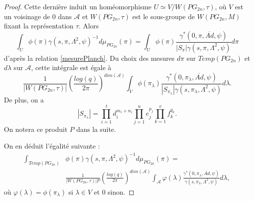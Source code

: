 \documentclass{amsart}
\begin{document}
\begin{proof}
Cette dernière induit un homéomorphisme $U \simeq V/W(PG_{2n}, \tau)$, où $V$ est un voisinage de 0 dans $\mathcal{A}$ et $W(PG_{2n}, \tau)$ est le sous-groupe de $W(PG_{2n}, M)$ fixant la représentation $\tau$. Alors
\begin{equation}
\int_U \phi(\pi) \gamma(s, \pi, \Lambda^2, \psi)^{-1} d\mu_{PG_{2n}}(\pi) = \int_U \phi(\pi) \frac{\gamma^*(0, \pi, \overline{Ad}, \psi)}{|S_{\pi}|\gamma(s, \pi, \Lambda^2, \psi)}  d\pi
\end{equation}
d'après la relation \ref{mesurePlanch}. Du choix des mesures $d\pi$ sur $Temp(PG_{2n})$ et $d\lambda$ sur $\mathcal{A}$, cette intégrale est égale à
\begin{equation}
\frac{1}{|W(PG_{2n}, \tau)|} \left(\frac{log(q)}{2\pi}\right)^{dim(\mathcal{A})}\int_{V} \phi(\pi_\lambda) \frac{\gamma^*(0, \pi_\lambda, \overline{Ad}, \psi)}{|S_{\pi_\lambda}|\gamma(s, \pi_\lambda, \Lambda^2, \psi)} d\lambda.
\end{equation}
De plus, on a
\begin{equation}
|S_{\pi_\lambda}| = \prod_{i=1}^t d_i^{m_i+n_i} \prod_{j=1}^u e_j^{p_j} \prod_{k=1}^v f_k^{q_k}.
\end{equation}
On notera ce produit $P$ dans la suite. 

On en déduit l'égalité suivante :
\begin{equation}
\label{defvarphi}
\begin{split}
\int_{Temp(PG_{2n})} &\phi(\pi) \gamma(s, \pi, \Lambda^2, \psi)^{-1} d\mu_{PG_{2n}}(\pi) = \\
& \frac{1}{|W(PG_{2n}, \tau)|P} \left(\frac{log(q)}{2\pi}\right)^{dim(\mathcal{A})} 
\int_{\mathcal{A}} \varphi(\lambda) \frac{\gamma^*(0, \pi_\lambda, \overline{Ad}, \psi)}{\gamma(s, \pi_\lambda, \Lambda^2, \psi)} d\lambda,
\end{split}
\end{equation}
où $\varphi(\lambda) = \phi(\pi_\lambda)$ si $\lambda \in V$ et $0$ sinon.


\end{proof}
\end{document}
